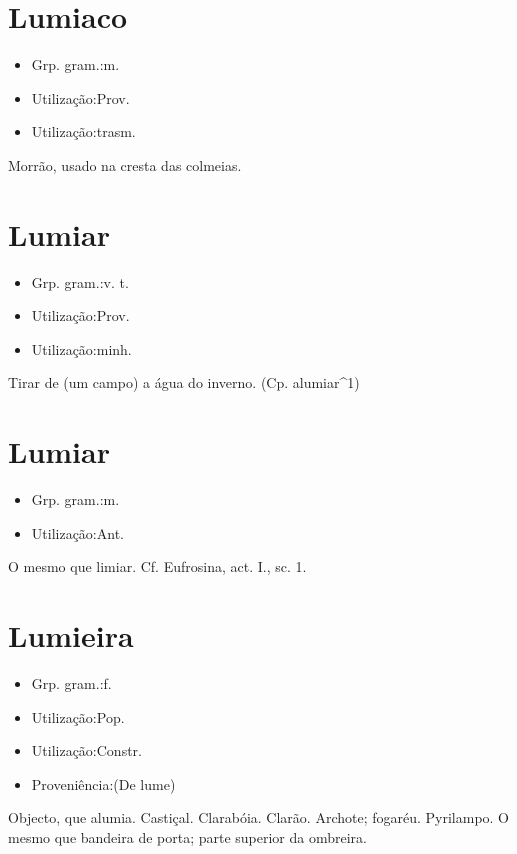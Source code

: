 \section{Lumiaco}
\begin{itemize}
\item {Grp. gram.:m.}
\end{itemize}
\begin{itemize}
\item {Utilização:Prov.}
\end{itemize}
\begin{itemize}
\item {Utilização:trasm.}
\end{itemize}
Morrão, usado na cresta das colmeias.
\section{Lumiar}
\begin{itemize}
\item {Grp. gram.:v. t.}
\end{itemize}
\begin{itemize}
\item {Utilização:Prov.}
\end{itemize}
\begin{itemize}
\item {Utilização:minh.}
\end{itemize}
Tirar de (um campo) a água do inverno.
(Cp. \textunderscore alumiar\textunderscore ^1)
\section{Lumiar}
\begin{itemize}
\item {Grp. gram.:m.}
\end{itemize}
\begin{itemize}
\item {Utilização:Ant.}
\end{itemize}
O mesmo que \textunderscore limiar\textunderscore . Cf. \textunderscore Eufrosina\textunderscore , act. I., sc. 1.
\section{Lumieira}
\begin{itemize}
\item {Grp. gram.:f.}
\end{itemize}
\begin{itemize}
\item {Utilização:Pop.}
\end{itemize}
\begin{itemize}
\item {Utilização:Constr.}
\end{itemize}
\begin{itemize}
\item {Proveniência:(De \textunderscore lume\textunderscore )}
\end{itemize}
Objecto, que alumia.
Castiçal.
Clarabóia.
Clarão.
Archote; fogaréu.
Pyrilampo.
O mesmo que bandeira de porta; parte superior da ombreira.
